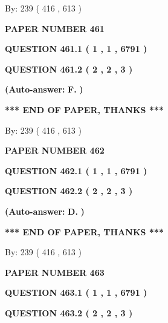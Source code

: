 \documentclass[12pt]{article}
\begin{document}
   
\hspace{1.0in} By: 
 239 ( 416 ,  613 )
   
   
   
   
\newpage 
\setcounter{page}{ 
   461001 } 
   
   
 {\textbf{ \Large{ PAPER NUMBER  461  }}}
   
   
   
   
  
  
{\textbf{\large{QUESTION
461.1 
 ( 1 , 1 , 6791 )
}}}
  
  
{\textbf{\large{QUESTION
461.2 
 ( 2 , 2 , 3 )
}}}
 
 
{\textbf{(Auto-answer:}}
{\textbf{\large{
F.}}}
{\textbf{)}}
 
 
   
   
   
   
\vspace{1.0in} 
{\textbf{\large{ *** END OF PAPER, THANKS *** }}} 
   
   
\hspace{1.0in} By: 
 239 ( 416 ,  613 )
   
   
   
   
\newpage 
\setcounter{page}{ 
   462001 } 
   
   
 {\textbf{ \Large{ PAPER NUMBER  462  }}}
   
   
   
   
  
  
{\textbf{\large{QUESTION
462.1 
 ( 1 , 1 , 6791 )
}}}
  
  
{\textbf{\large{QUESTION
462.2 
 ( 2 , 2 , 3 )
}}}
 
 
{\textbf{(Auto-answer:}}
{\textbf{\large{
D.}}}
{\textbf{)}}
 
 
   
   
   
   
\vspace{1.0in} 
{\textbf{\large{ *** END OF PAPER, THANKS *** }}} 
   
   
\hspace{1.0in} By: 
 239 ( 416 ,  613 )
   
   
   
   
\newpage 
\setcounter{page}{ 
   463001 } 
   
   
 {\textbf{ \Large{ PAPER NUMBER  463  }}}
   
   
   
   
  
  
{\textbf{\large{QUESTION
463.1 
 ( 1 , 1 , 6791 )
}}}
  
  
{\textbf{\large{QUESTION
463.2 
 ( 2 , 2 , 3 )
}}}
 
\end{document}

